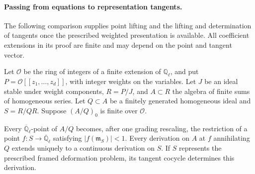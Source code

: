 \paragraph{Passing from equations to representation tangents.}
The following comparison supplies point lifting and the lifting and
determination of tangents once the prescribed weighted presentation is available.
All coefficient extensions in its proof are finite and may depend on
the point and tangent vector.

\begin{proposition}\label{prop:selmer-tangent-comparison}
Let \(\mathcal O\) be the ring of integers of a finite extension of
\(\mathbb Q_\ell\), and put \(P=\mathcal O[[z_1,\ldots,z_d]]\),
with integer weights on the variables. Let \(J\) be an ideal stable
under weight components, \(R=P/J\), and \(A\subset R\) the
algebra of finite sums of homogeneous series. Let \(Q\subset A\)
be a finitely generated homogeneous ideal and \(S=R/QR\). Suppose
\((A/Q)_0\) is finite over \(\mathcal O\).

Every \(\overline{\mathbb Q}_\ell\)-point of \(A/Q\) becomes,
after one grading rescaling, the restriction of a point
\(f:S\to\overline{\mathbb Q}_\ell\) satisfying
\(|f(\mathfrak m_S)|<1\). Every derivation on \(A\) at \(f\)
annihilating \(Q\) extends uniquely to a continuous derivation on
\(S\). If \(S\) represents the prescribed framed deformation
problem, its tangent cocycle determines this derivation.
\end{proposition}

